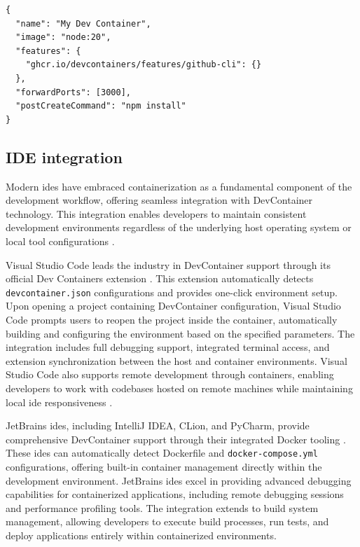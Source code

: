 \begin{lstlisting}[caption={Sample \texttt{devcontainer.json} Configuration}, label={lst:devcontainer_json}]
{
  "name": "My Dev Container",
  "image": "node:20",
  "features": {
    "ghcr.io/devcontainers/features/github-cli": {}
  },
  "forwardPorts": [3000],
  "postCreateCommand": "npm install"
}
\end{lstlisting}


\subsection{IDE integration}
Modern \ac{ide}s have embraced containerization as a fundamental component of the development workflow, offering seamless integration with DevContainer technology.
This integration enables developers to maintain consistent development environments regardless of the underlying host operating system or local tool configurations \citep{DevelopmentContainers2025}.

Visual Studio Code leads the industry in DevContainer support through its official Dev Containers extension \citep{microsoftDevelopingContainer2025}.
This extension automatically detects \texttt{devcontainer.json} configurations and provides one-click environment setup.
Upon opening a project containing DevContainer configuration, Visual Studio Code prompts users to reopen the project inside the container, automatically building and configuring the environment based on the specified parameters.
The integration includes full debugging support, integrated terminal access, and extension synchronization between the host and container environments.
Visual Studio Code also supports remote development through containers, enabling developers to work with codebases hosted on remote machines while maintaining local \ac{ide} responsiveness \citep{luDevelopmentDockerContainers2018}.

JetBrains \acp{ide}, including IntelliJ IDEA, CLion, and PyCharm, provide comprehensive DevContainer support through their integrated Docker tooling \citep{jetbrainsUsingDevContainers2024}.
These \acp{ide} can automatically detect Dockerfile and \texttt{docker-compose.yml} configurations, offering built-in container management directly within the development environment.
JetBrains \acp{ide} excel in providing advanced debugging capabilities for containerized applications, including remote debugging sessions and performance profiling tools.
The integration extends to build system management, allowing developers to execute build processes, run tests, and deploy applications entirely within containerized environments.

